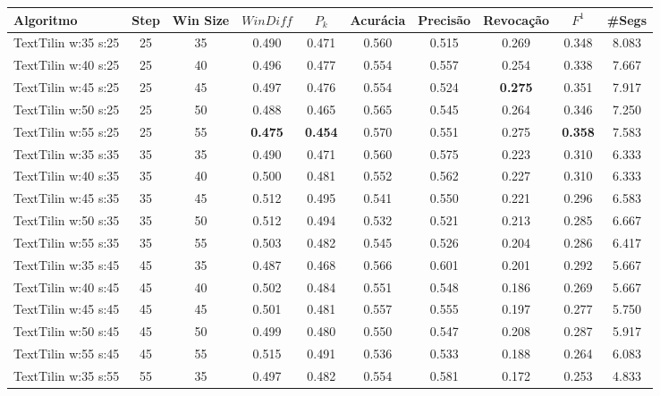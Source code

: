 \documentclass{article}
\begin{document}
 

\begin{longtable}[c]{|l|c|c|c|c|c|c|c|c|c|} 
\hline 
Algoritmo & Step & Win Size & $WinDiff$ & $P_k$ & Acurácia & Precisão & Revocação & $F^1$ & \#Segs\\ \hline 
TextTilin w:35 s:25 & 25 & 35 & 0.490 & 0.471 & 0.560 & 0.515 & 0.269 & 0.348 & 8.083  \\ \hline 
 TextTilin w:40 s:25 & 25 & 40 & 0.496 & 0.477 & 0.554 & 0.557 & 0.254 & 0.338 & 7.667  \\ \hline 
 TextTilin w:45 s:25 & 25 & 45 & 0.497 & 0.476 & 0.554 & 0.524 & \cellcolor{gray!20} \textbf{0.275} & 0.351 & 7.917  \\ \hline 
 TextTilin w:50 s:25 & 25 & 50 & 0.488 & 0.465 & 0.565 & 0.545 & 0.264 & 0.346 & 7.250  \\ \hline 
 TextTilin w:55 s:25 & 25 & 55 & \cellcolor{gray!20} \textbf{0.475} & \cellcolor{gray!20} \textbf{0.454} & 0.570 & 0.551 & 0.275 & \cellcolor{gray!20} \textbf{0.358} & 7.583  \\ \hline 
 TextTilin w:35 s:35 & 35 & 35 & 0.490 & 0.471 & 0.560 & 0.575 & 0.223 & 0.310 & 6.333  \\ \hline 
 TextTilin w:40 s:35 & 35 & 40 & 0.500 & 0.481 & 0.552 & 0.562 & 0.227 & 0.310 & 6.333  \\ \hline 
 TextTilin w:45 s:35 & 35 & 45 & 0.512 & 0.495 & 0.541 & 0.550 & 0.221 & 0.296 & 6.583  \\ \hline 
 TextTilin w:50 s:35 & 35 & 50 & 0.512 & 0.494 & 0.532 & 0.521 & 0.213 & 0.285 & 6.667  \\ \hline 
 TextTilin w:55 s:35 & 35 & 55 & 0.503 & 0.482 & 0.545 & 0.526 & 0.204 & 0.286 & 6.417  \\ \hline 
 TextTilin w:35 s:45 & 45 & 35 & 0.487 & 0.468 & 0.566 & 0.601 & 0.201 & 0.292 & 5.667  \\ \hline 
 TextTilin w:40 s:45 & 45 & 40 & 0.502 & 0.484 & 0.551 & 0.548 & 0.186 & 0.269 & 5.667  \\ \hline 
 TextTilin w:45 s:45 & 45 & 45 & 0.501 & 0.481 & 0.557 & 0.555 & 0.197 & 0.277 & 5.750  \\ \hline 
 TextTilin w:50 s:45 & 45 & 50 & 0.499 & 0.480 & 0.550 & 0.547 & 0.208 & 0.287 & 5.917  \\ \hline 
 TextTilin w:55 s:45 & 45 & 55 & 0.515 & 0.491 & 0.536 & 0.533 & 0.188 & 0.264 & 6.083  \\ \hline 
 TextTilin w:35 s:55 & 55 & 35 & 0.497 & 0.482 & 0.554 & 0.581 & 0.172 & 0.253 & 4.833  \\ \hline 

\end{longtable}
\end{document}
